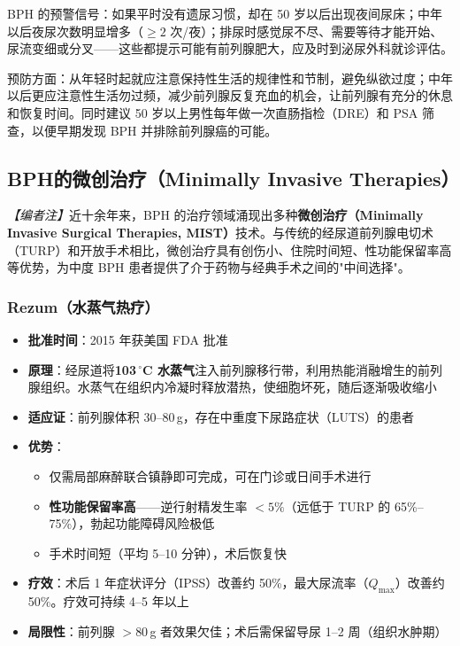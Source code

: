 \begin{enumerate}
\begin{tcolorbox}[colback=pink!5!white,colframe=red!50~50!black,title=贴心小叮咛]
BPH 的预警信号：如果平时没有遗尿习惯，却在 50 岁以后出现夜间尿床；中年以后夜尿次数明显增多（$\geq2$ 次/夜）；排尿时感觉尿不尽、需要等待才能开始、尿流变细或分叉——这些都提示可能有前列腺肥大，应及时到泌尿外科就诊评估。

预防方面：从年轻时起就应注意保持性生活的规律性和节制，避免纵欲过度；中年以后更应注意性生活勿过频，减少前列腺反复充血的机会，让前列腺有充分的休息和恢复时间。同时建议 50 岁以上男性每年做一次直肠指检（DRE）和 PSA 筛查，以便早期发现 BPH 并排除前列腺癌的可能。
\end{tcolorbox}

\subsection{BPH的微创治疗（Minimally Invasive Therapies）}
\label{subsec:bph_minitreatment}

\noindent\textit{【编者注】}近十余年来，BPH 的治疗领域涌现出多种\textbf{微创治疗（Minimally Invasive Surgical Therapies, MIST）}技术。与传统的经尿道前列腺电切术（TURP）和开放手术相比，微创治疗具有创伤小、住院时间短、性功能保留率高等优势，为中度 BPH 患者提供了介于药物与经典手术之间的"中间选择"。

\subsubsection{Rezum（水蒸气热疗）}

\begin{itemize}[leftmargin=2cm]
	\item \textbf{批准时间}：2015 年获美国 FDA 批准
	\item \textbf{原理}：经尿道将\textbf{103\,$^\circ$C 水蒸气}注入前列腺移行带，利用热能消融增生的前列腺组织。水蒸气在组织内冷凝时释放潜热，使细胞坏死，随后逐渐吸收缩小
	\item \textbf{适应证}：前列腺体积 30--80\,g，存在中重度下尿路症状（LUTS）的患者
	\item \textbf{优势}：
	\begin{itemize}
		\item 仅需局部麻醉联合镇静即可完成，可在门诊或日间手术进行
		\item \textbf{性功能保留率高}——逆行射精发生率 $<5\%$（远低于 TURP 的 65\%--75\%），勃起功能障碍风险极低
		\item 手术时间短（平均 5--10 分钟），术后恢复快
	\end{itemize}
	\item \textbf{疗效}：术后 1 年症状评分（IPSS）改善约 50\%，最大尿流率（$Q_{\max}$）改善约 50\%。疗效可持续 4--5 年以上
	\item \textbf{局限性}：前列腺 $>80$\,g 者效果欠佳；术后需保留导尿 1--2 周（组织水肿期）
\end{itemize}


\end{enumerate}
